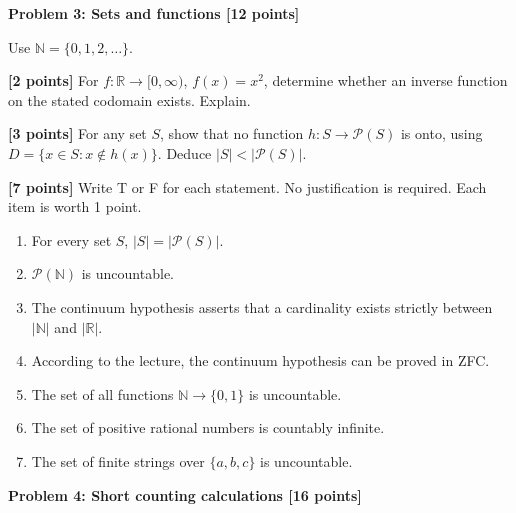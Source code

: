 \documentclass[12pt,letterpaper]{article}
\newcommand{\problemheading}[2][5\baselineskip]{\Needspace{#1}\par\noindent\hspace*{-0.625in}\textbf{#2}\par\nobreak\vspace{0.3em}}
\newcommand{\examspace}[1]{\par\vspace*{#1cm}}
\begin{document}
\clearpage
\vspace*{0.21in}
\problemheading{Problem 3: Sets and functions [12 points]}
\begin{list}{}{\setlength{\leftmargin}{0.25in}\setlength{\rightmargin}{0.25in}}\item[]
Use $\mathbb N=\{0,1,2,\ldots\}$.
\begin{description}[font=\normalfont,leftmargin=1.2em,labelsep=0.4em]
\item[(a)] \textbf{[2 points]} For $f:\mathbb R\to[0,\infty)$, $f(x)=x^2$, determine whether an inverse function on the stated codomain exists. Explain.
\examspace{3}
\Needspace{\dimexpr 5cm+4\baselineskip\relax}
\item[(b)] \textbf{[3 points]} For any set $S$, show that no function $h:S\to\mathcal P(S)$ is onto, using $D=\{x\in S:x\notin h(x)\}$. Deduce $|S|<|\mathcal P(S)|$.
\examspace{5}
\Needspace{\dimexpr 1cm+4\baselineskip\relax}
\item[(c)] \textbf{[7 points]} Write T or F for each statement. No justification is required. Each item is worth 1 point.\begin{enumerate}[label=(\roman*)]\item For every set $S$, $|S|=|\mathcal P(S)|$.\item $\mathcal P(\mathbb N)$ is uncountable.\item The continuum hypothesis asserts that a cardinality exists strictly between $|\mathbb N|$ and $|\mathbb R|$.\item According to the lecture, the continuum hypothesis can be proved in ZFC.\item The set of all functions $\mathbb N\to\{0,1\}$ is uncountable.\item The set of positive rational numbers is countably infinite.\item The set of finite strings over $\{a,b,c\}$ is uncountable.\end{enumerate}
\examspace{1}
\end{description}
\end{list}
\clearpage
\vspace*{0.21in}
\problemheading{Problem 4: Short counting calculations [16 points]}
\end{document}
